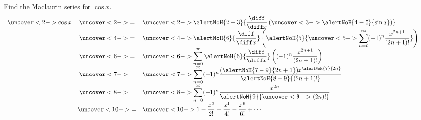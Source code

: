 \begin{frame}
\begin{example}
Find the Maclaurin series for $\cos x$.
\abovedisplayskip 0cm
\belowdisplayskip 0cm
\[
\begin{array}{rcl}
\uncover<2->{\cos x}& \uncover<2->{=}&\displaystyle  \uncover<2->{ \alertNoH{ 2-3}{\frac{\diff}{\diff x}\left( \uncover<3->{\alertNoH{ 4-5}{\sin x}}\right) }}%
\\
& \uncover<4->{=} &\displaystyle \uncover<4->{ \alertNoH{ 6}{\frac{\diff}{\diff x}}\left( \alertNoH{ 5}{\uncover<5->{ \sum_{n=0}^\infty (-1)^n\frac{x^{2n+1}}{ (2n+1)!}}}\right) } \\%
& \uncover<6->{=} &\displaystyle \uncover<6->{ \sum_{n=0}^\infty \alertNoH{ 6}{\frac{\diff}{\diff x}}\left( (-1)^n\frac{x^{2n+1}}{ (2n+1)!}\right)} \\%
& \uncover<7->{=} &\displaystyle \uncover<7->{ \sum_{n=0}^\infty (-1)^n\frac{(\alertNoH{ 7-9}{2n+1})x^{\alertNoH{ 7}{2n}}}{\alertNoH{ 8-9}{(2n+1)!}}} \\%
& \uncover<8->{=} &\displaystyle \uncover<8->{ \sum_{n=0}^\infty (-1)^n\frac{x^{2n}}{\alertNoH{ 9}{\uncover<9->{(2n)!}}}} \\%
& \uncover<10->{=} &\displaystyle  \uncover<10->{ 1 - \frac{x^2}{2!} + \frac{x^4}{4!} - \frac{x^6}{6!} + \cdots }%
\end{array}
\]

%
\end{example}
\end{frame}
